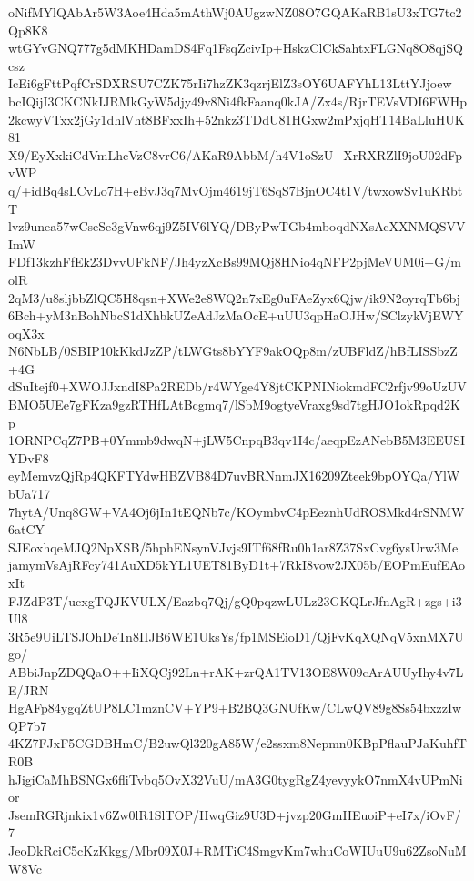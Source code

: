oNifMYlQAbAr5W3Aoe4Hda5mAthWj0AUgzwNZ08O7GQAKaRB1sU3xTG7tc2Qp8K8
wtGYvGNQ777g5dMKHDamDS4Fq1FsqZcivIp+HskzClCkSahtxFLGNq8O8qjSQcsz
IcEi6gFttPqfCrSDXRSU7CZK75rIi7hzZK3qzrjElZ3sOY6UAFYhL13LttYJjoew
bcIQijI3CKCNkIJRMkGyW5djy49v8Ni4fkFaanq0kJA/Zx4s/RjrTEVsVDI6FWHp
2kcwyVTxx2jGy1dhlVht8BFxxIh+52nkz3TDdU81HGxw2mPxjqHT14BaLluHUK81
X9/EyXxkiCdVmLhcVzC8vrC6/AKaR9AbbM/h4V1oSzU+XrRXRZlI9joU02dFpvWP
q/+idBq4sLCvLo7H+eBvJ3q7MvOjm4619jT6SqS7BjnOC4t1V/twxowSv1uKRbtT
lvz9unea57wCseSe3gVnw6qj9Z5IV6lYQ/DByPwTGb4mboqdNXsAcXXNMQSVVImW
FDf13kzhFfEk23DvvUFkNF/Jh4yzXcBs99MQj8HNio4qNFP2pjMeVUM0i+G/molR
2qM3/u8sljbbZlQC5H8qsn+XWe2e8WQ2n7xEg0uFAeZyx6Qjw/ik9N2oyrqTb6bj
6Bch+yM3nBohNbcS1dXhbkUZeAdJzMaOcE+uUU3qpHaOJHw/SClzykVjEWYoqX3x
N6NbLB/0SBIP10kKkdJzZP/tLWGts8bYYF9akOQp8m/zUBFldZ/hBfLISSbzZ+4G
dSuItejf0+XWOJJxndI8Pa2REDb/r4WYge4Y8jtCKPNINiokmdFC2rfjv99oUzUV
BMO5UEe7gFKza9gzRTHfLAtBcgmq7/lSbM9ogtyeVraxg9sd7tgHJO1okRpqd2Kp
1ORNPCqZ7PB+0Ymmb9dwqN+jLW5CnpqB3qv1I4c/aeqpEzANebB5M3EEUSIYDvF8
eyMemvzQjRp4QKFTYdwHBZVB84D7uvBRNnmJX16209Zteek9bpOYQa/YlWbUa717
7hytA/Unq8GW+VA4Oj6jIn1tEQNb7c/KOymbvC4pEeznhUdROSMkd4rSNMW6atCY
SJEoxhqeMJQ2NpXSB/5hphENsynVJvjs9ITf68fRu0h1ar8Z37SxCvg6ysUrw3Me
jamymVsAjRFcy741AuXD5kYL1UET81ByD1t+7RkI8vow2JX05b/EOPmEufEAoxIt
FJZdP3T/ucxgTQJKVULX/Eazbq7Qj/gQ0pqzwLULz23GKQLrJfnAgR+zgs+i3Ul8
3R5e9UiLTSJOhDeTn8IIJB6WE1UksYs/fp1MSEioD1/QjFvKqXQNqV5xnMX7Ugo/
ABbiJnpZDQQaO++IiXQCj92Ln+rAK+zrQA1TV13OE8W09cArAUUyIhy4v7LE/JRN
HgAFp84ygqZtUP8LC1mznCV+YP9+B2BQ3GNUfKw/CLwQV89g8Ss54bxzzIwQP7b7
4KZ7FJxF5CGDBHmC/B2uwQl320gA85W/e2ssxm8Nepmn0KBpPflauPJaKuhfTR0B
hJigiCaMhBSNGx6fliTvbq5OvX32VuU/mA3G0tygRgZ4yevyykO7nmX4vUPmNior
JsemRGRjnkix1v6Zw0lR1SlTOP/HwqGiz9U3D+jvzp20GmHEuoiP+eI7x/iOvF/7
JeoDkRciC5cKzKkgg/Mbr09X0J+RMTiC4SmgvKm7whuCoWIUuU9u62ZsoNuMW8Vc
